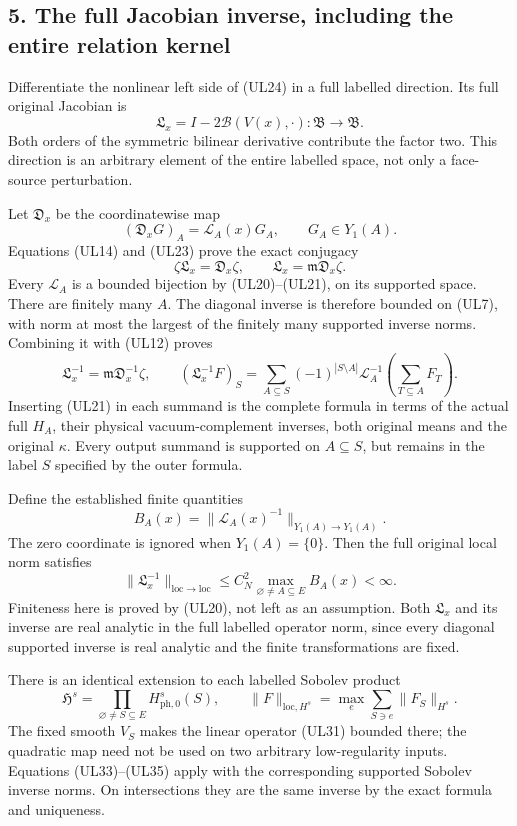 \documentclass[11pt]{article}
\begin{document}
\subsection*{5. The full Jacobian inverse, including the entire relation kernel}

Differentiate the nonlinear left side of (UL24) in a full labelled direction. Its full original Jacobian is
\[
 \mathfrak L_x=I-2\mathcal B(V(x),\cdot):
              \mathfrak B\longrightarrow\mathfrak B.
 \tag{UL31}
\]
Both orders of the symmetric bilinear derivative contribute the factor two. This direction is an arbitrary element of the entire labelled space, not only a face-source perturbation.

Let \(\mathfrak D_x\) be the coordinatewise map
\[
 (\mathfrak D_xG)_A=\mathscr L_A(x)G_A,\qquad
 G_A\in Y_1(A).
 \tag{UL32}
\]
Equations (UL14) and (UL23) prove the exact conjugacy
\[
 \boxed{\zeta\mathfrak L_x=\mathfrak D_x\zeta,\qquad
         \mathfrak L_x=\mathfrak m\mathfrak D_x\zeta.}
 \tag{UL33}
\]
Every \(\mathscr L_A\) is a bounded bijection by (UL20)–(UL21), on its supported space. There are finitely many \(A\). The diagonal inverse is therefore bounded on (UL7), with norm at most the largest of the finitely many supported inverse norms. Combining it with (UL12) proves
\[
 \boxed{\mathfrak L_x^{-1}
          =\mathfrak m\mathfrak D_x^{-1}\zeta,\qquad
  (\mathfrak L_x^{-1}F)_S
   =\sum_{A\subseteq S}(-1)^{|S\setminus A|}
       \mathscr L_A^{-1}\left(\sum_{T\subseteq A}F_T\right).}
 \tag{UL34}
\]
Inserting (UL21) in each summand is the complete formula in terms of the actual full \(H_A\), their physical vacuum-complement inverses, both original means and the original \(\kappa\). Every output summand is supported on \(A\subseteq S\), but remains in the label \(S\) specified by the outer formula.

Define the established finite quantities
\[
 B_A(x)=\|\mathscr L_A(x)^{-1}\|_{Y_1(A)\to Y_1(A)}.
\]
The zero coordinate is ignored when \(Y_1(A)=\{0\}\). Then the full original local norm satisfies
\[
 \boxed{\|\mathfrak L_x^{-1}\|_{\mathrm{loc}\to\mathrm{loc}}
          \le C_N^2\max_{\varnothing\ne A\subseteq E}B_A(x)<\infty.}
 \tag{UL35}
\]
Finiteness here is proved by (UL20), not left as an assumption. Both \(\mathfrak L_x\) and its inverse are real analytic in the full labelled operator norm, since every diagonal supported inverse is real analytic and the finite transformations are fixed.

There is an identical extension to each labelled Sobolev product
\[
 \mathfrak H^s=\prod_{\varnothing\ne S\subseteq E}H^s_{\mathrm{ph},0}(S),
 \qquad
 \|F\|_{\mathrm{loc},H^s}
 =\max_e\sum_{S\ni e}\|F_S\|_{H^s}.
 \tag{UL36}
\]
The fixed smooth \(V_S\) makes the linear operator (UL31) bounded there; the quadratic map need not be used on two arbitrary low-regularity inputs. Equations (UL33)–(UL35) apply with the corresponding supported Sobolev inverse norms. On intersections they are the same inverse by the exact formula and uniqueness.
\end{document}
